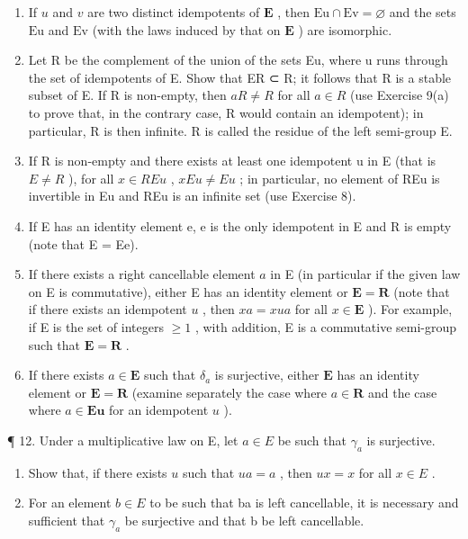 \begin{enumerate}
\def\labelenumi{(\alph{enumi})}
\setcounter{enumi}{1}
\item
  If \(u\) and \(v\) are two distinct idempotents of \(\mathbf{E}\) , then \(\mathrm{Eu} \cap \mathrm{Ev} = \varnothing\) and the sets \(\mathrm{Eu}\) and \(\mathrm{Ev}\) (with the laws induced by that on \(\mathbf{E}\) ) are isomorphic.
\item
  Let R be the complement of the union of the sets Eu, where u runs through the set of idempotents of E. Show that ER ⊂ R; it follows that R is a stable subset of E. If R is non-empty, then \(aR \neq R\) for all \(a \in R\) (use Exercise 9(a) to prove that, in the contrary case, R would contain an idempotent); in particular, R is then infinite. R is called the residue of the left semi-group E.
\item
  If R is non-empty and there exists at least one idempotent u in E (that is \(E \neq R\) ), for all \(x \in REu\) , \(xEu \neq Eu\) ; in particular, no element of REu is invertible in Eu and REu is an infinite set (use Exercise 8).
\item
  If E has an identity element e, e is the only idempotent in E and R is empty (note that E = Ee).
\item
  If there exists a right cancellable element \(a\) in E (in particular if the given law on E is commutative), either E has an identity element or \(\mathbf{E} = \mathbf{R}\) (note that if there exists an idempotent \(u\) , then \(xa = xua\) for all \(x \in \mathbf{E}\) ). For example, if E is the set of integers \(\geqslant 1\) , with addition, E is a commutative semi-group such that \(\mathbf{E} = \mathbf{R}\) .
\item
  If there exists \(a \in \mathbf{E}\) such that \(\delta_a\) is surjective, either \(\mathbf{E}\) has an identity element or \(\mathbf{E} = \mathbf{R}\) (examine separately the case where \(a \in \mathbf{R}\) and the case where \(a \in \mathbf{Eu}\) for an idempotent \(u\) ).
\end{enumerate}

¶ 12. Under a multiplicative law on E, let \(a \in E\) be such that \(\gamma_{a}\) is surjective.

\begin{enumerate}
\def\labelenumi{(\alph{enumi})}
\item
  Show that, if there exists \(u\) such that \(ua = a\) , then \(ux = x\) for all \(x \in E\) .
\item
  For an element \(b \in E\) to be such that ba is left cancellable, it is necessary and sufficient that \(\gamma_{a}\) be surjective and that b be left cancellable.
\end{enumerate}

